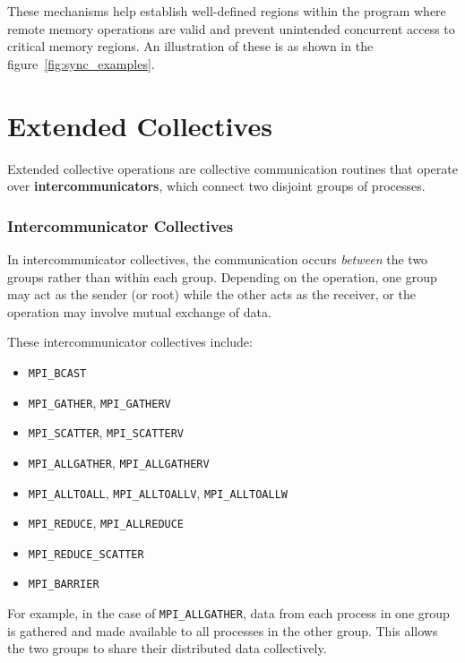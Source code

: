 \documentclass[12pt]{book}
\begin{document}
These mechanisms help establish well-defined regions within the program where remote memory operations are valid and prevent unintended concurrent access to critical memory regions. An illustration of these is as shown in the figure~\ref{fig:sync_examples}.

\section{Extended Collectives}
Extended collective operations are collective communication routines that operate over \textbf{intercommunicators}, which connect two disjoint groups of processes. 

\subsubsection{Intercommunicator Collectives}
In intercommunicator collectives, the communication occurs \emph{between} the two groups rather than within each group. Depending on the operation, one group may act as the sender (or root) while the other acts as the receiver, or the operation may involve mutual exchange of data.

These intercommunicator collectives include:
\begin{itemize}
    \item \texttt{MPI\_BCAST}
    \item \texttt{MPI\_GATHER}, \texttt{MPI\_GATHERV}
    \item \texttt{MPI\_SCATTER}, \texttt{MPI\_SCATTERV}
    \item \texttt{MPI\_ALLGATHER}, \texttt{MPI\_ALLGATHERV}
    \item \texttt{MPI\_ALLTOALL}, \texttt{MPI\_ALLTOALLV}, \texttt{MPI\_ALLTOALLW}
    \item \texttt{MPI\_REDUCE}, \texttt{MPI\_ALLREDUCE}
    \item \texttt{MPI\_REDUCE\_SCATTER}
    \item \texttt{MPI\_BARRIER}
\end{itemize}

For example, in the case of \texttt{MPI\_ALLGATHER}, data from each process in one group is gathered and made available to all processes in the other group. This allows the two groups to share their distributed data collectively.
\end{document}
